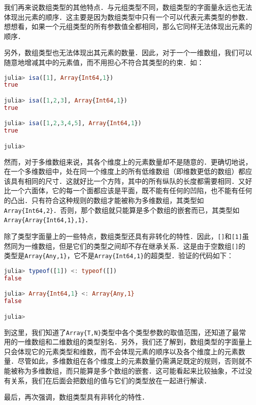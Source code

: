我们再来说数组类型的其他特点．与元组类型不同，数组类型的字面量永远也无法体现出元素的顺序．这主要是因为数组类型中只有一个可以代表元素类型的参数．想想看，如果一个元组类型的所有参数值全都相同，那么它同样无法体现出元素的顺序．

另外，数组类型也无法体现出其元素的数量．因此，对于一个一维数组，我们可以随意地增减其中的元素值，而不用担心不符合其类型的约束．如：

\begin{lstlisting}[language=julia]
julia> isa([1], Array{Int64,1})
true

julia> isa([1,2,3], Array{Int64,1})
true

julia> isa([1,2,3,4,5], Array{Int64,1})
true

julia> 
\end{lstlisting}

然而，对于多维数组来说，其各个维度上的元素数量却不是随意的．更确切地说，在一个多维数组中，处在同一个维度上的所有低维数组（即维数更低的数组）都应该具有相同的尺寸．这就好比一个方阵，其中的所有纵队的长度都需要相同．又好比一个六面体，它的每一个面都应该是平面，既不能有任何的凹陷，也不能有任何的凸出．只有符合这种规则的数组才能被称为多维数组，其类型如\verb|Array{Int64,2}|．否则，那个数组就只能算是多个数组的嵌套而已，其类型如\verb|Array{Array{Int64,1},1}|．

除了类型字面量上的一些特点，数组类型还具有非转化的特性．因此，\verb|[]|和\verb|[1]|虽然同为一维数组，但是它们的类型之间却不存在继承关系．这是由于空数组\verb|[]|的类型是\verb|Array{Any,1}|，它不是\verb|Array{Int64,1}|的超类型．验证的代码如下：

\begin{lstlisting}[language=julia]
julia> typeof([1]) <: typeof([])
false

julia> Array{Int64,1} <: Array{Any,1}
false

julia> 
\end{lstlisting}

到这里，我们知道了\verb|Array{T,N}|类型中各个类型参数的取值范围，还知道了最常用的一维数组和二维数组的类型别名．另外，我们还了解到，数组类型的字面量上只会体现它的元素类型和维数，而不会体现元素的顺序以及各个维度上的元素数量．尽管如此，多维数组在各个维度上的元素数量仍需满足既定的规则，否则就不能被称为多维数组，而只能算是多个数组的嵌套．这可能看起来比较抽象，不过没有关系，我们在后面会把数组的值与它们的类型放在一起进行解读．

最后，再次强调，数组类型具有非转化的特性．